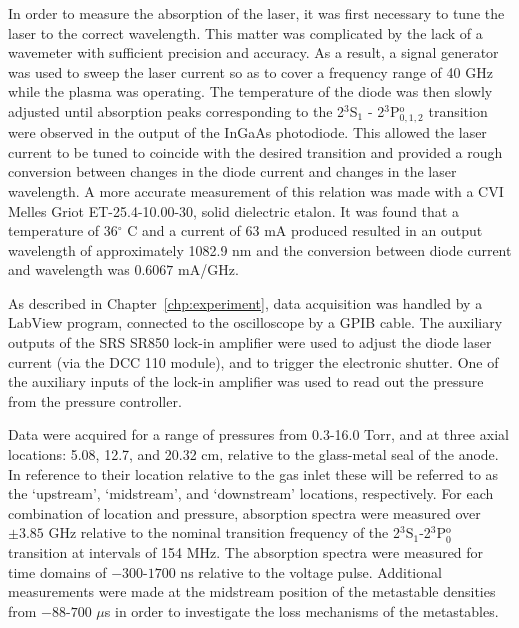 In order to measure the absorption of the laser, it was first necessary to tune
the laser to the correct wavelength. This matter was complicated by the lack of
a wavemeter with sufficient precision and accuracy. As a result, a signal
generator was used to sweep the laser current so as to cover a frequency range
of 40 GHz while the plasma was operating. The temperature of the diode was then
slowly adjusted until absorption peaks corresponding to the 2$^3$S$_1$ -
2$^3$P$_{0,1,2}^\mathrm{o}$ transition were observed in the output of the InGaAs
photodiode. This allowed the laser current to be tuned to coincide with the
desired transition and provided a rough conversion between changes in the diode
current and changes in the laser wavelength. A more accurate measurement of this
relation was made with a CVI Melles Griot ET-25.4-10.00-30, solid dielectric
etalon. It was found that a temperature of 36$^\circ$ C and a current of 63 mA
produced resulted in an output wavelength of approximately 1082.9 nm and the
conversion between diode current and wavelength was $0.6067$ mA/GHz.

As described in Chapter~\ref{chp:experiment}, data acquisition was handled by a
LabView program, connected to the oscilloscope by a GPIB cable. The auxiliary
outputs of the SRS SR850 lock-in amplifier were used to adjust the diode laser
current (via the DCC 110 module), and to trigger the electronic shutter. One of
the auxiliary inputs of the lock-in amplifier was used to read out the pressure
from the pressure controller.

Data were acquired for a range of pressures from 0.3-16.0 Torr, and at three
axial locations: 5.08, 12.7, and 20.32 cm, relative to the glass-metal seal of
the anode. In reference to their location relative to the gas inlet these will
be referred to as the `upstream', `midstream', and `downstream' locations,
respectively. For each combination of location and pressure, absorption spectra
were measured over $\pm3.85$ GHz relative to the nominal transition frequency of
the 2$^3$S$_1$-2$^3$P$_0^\mathrm{o}$ transition at intervals of 154 MHz. The
absorption spectra were measured for time domains of $-300$-$1700$ ns relative
to the voltage pulse. Additional measurements were made at the midstream
position of the metastable densities from $-88$-$700$ $\mu$s in order to
investigate the loss mechanisms of the metastables.

